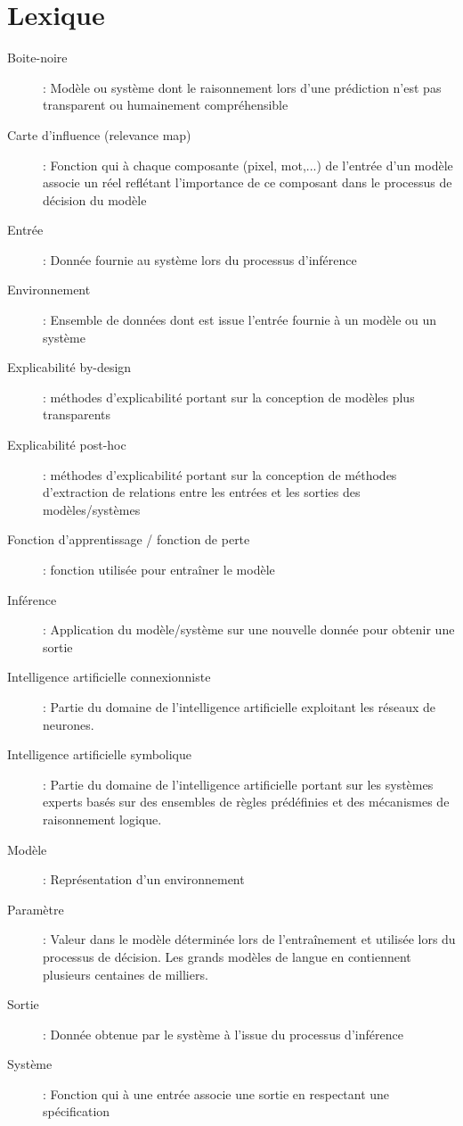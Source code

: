 \documentclass{report}
\begin{document}
\section{Lexique}

\begin{description}
    \item[Boite-noire] : Modèle ou système dont le raisonnement lors d'une prédiction n'est pas transparent ou humainement compréhensible
    \item[Carte d'influence (relevance map)] : Fonction qui à chaque composante (pixel, mot,...) de l'entrée d'un modèle associe un réel reflétant l'importance de ce composant dans le processus de décision du modèle
    \item[Entrée] : Donnée fournie au système lors du processus d'inférence
    \item[Environnement] : Ensemble de données dont est issue l'entrée fournie à un modèle ou un système
    \item[Explicabilité by-design] : méthodes d'explicabilité portant sur la conception de modèles plus transparents 
    \item[Explicabilité post-hoc] : méthodes d'explicabilité portant sur la conception de méthodes d'extraction de relations entre les entrées et les sorties des modèles/systèmes
    \item[Fonction d'apprentissage / fonction de perte] : fonction utilisée pour entraîner le modèle
    \item[Inférence] : Application du modèle/système sur une nouvelle donnée pour obtenir une sortie
    \item[Intelligence artificielle connexionniste] : Partie du domaine de l'intelligence artificielle exploitant les réseaux de neurones.
    \item[Intelligence artificielle symbolique] : Partie du domaine de l'intelligence artificielle portant sur les systèmes experts basés sur des ensembles de règles prédéfinies et des mécanismes de raisonnement logique.
    \item[Modèle] : Représentation d'un environnement
    \item[Paramètre] : Valeur dans le modèle déterminée lors de l'entraînement et utilisée lors du processus de décision. Les grands modèles de langue en contiennent plusieurs centaines de milliers.
    \item[Sortie] : Donnée obtenue par le système à l'issue du processus d'inférence
    \item[Système] : Fonction qui à une entrée associe une sortie en respectant une spécification
\end{description}




\end{document}
